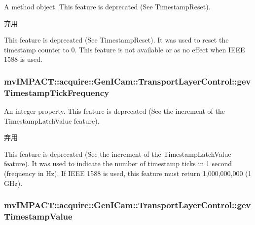 A method object. This feature is deprecated (See Timestamp\+Reset). 

\begin{DoxyRefDesc}{弃用}
\item[\hyperlink{deprecated__deprecated000080}{弃用}]This feature is deprecated (See Timestamp\+Reset). It was used to reset the timestamp counter to 0. This feature is not available or as no effect when I\+E\+E\+E 1588 is used. \end{DoxyRefDesc}
\hypertarget{classmv_i_m_p_a_c_t_1_1acquire_1_1_gen_i_cam_1_1_transport_layer_control_a2cd5a80f9d9c41abb2fb4d46dfd1db74}{
\subsubsection[{gev\+Timestamp\+Tick\+Frequency}]{ mv\+I\+M\+P\+A\+C\+T\+::acquire\+::\+Gen\+I\+Cam\+::\+Transport\+Layer\+Control\+::gev\+Timestamp\+Tick\+Frequency}}\label{classmv_i_m_p_a_c_t_1_1acquire_1_1_gen_i_cam_1_1_transport_layer_control_a2cd5a80f9d9c41abb2fb4d46dfd1db74}


An integer property. This feature is deprecated (See the increment of the Timestamp\+Latch\+Value feature). 

\begin{DoxyRefDesc}{弃用}
\item[\hyperlink{deprecated__deprecated000078}{弃用}]This feature is deprecated (See the increment of the Timestamp\+Latch\+Value feature). It was used to indicate the number of timestamp ticks in 1 second (frequency in Hz). If I\+E\+E\+E 1588 is used, this feature must return 1,000,000,000 (1 G\+Hz). \end{DoxyRefDesc}
\hypertarget{classmv_i_m_p_a_c_t_1_1acquire_1_1_gen_i_cam_1_1_transport_layer_control_afdf9e13e89c38f15b6bbc80976f14cbe}{
\subsubsection[{gev\+Timestamp\+Value}]{ mv\+I\+M\+P\+A\+C\+T\+::acquire\+::\+Gen\+I\+Cam\+::\+Transport\+Layer\+Control\+::gev\+Timestamp\+Value}}\label{classmv_i_m_p_a_c_t_1_1acquire_1_1_gen_i_cam_1_1_transport_layer_control_afdf9e13e89c38f15b6bbc80976f14cbe}


